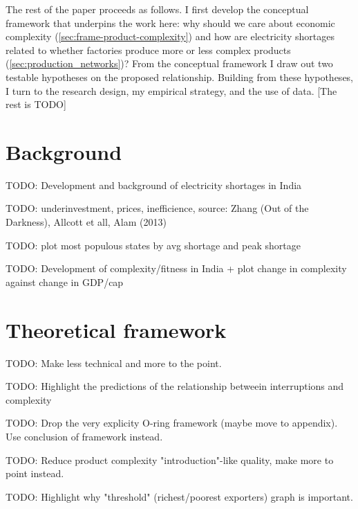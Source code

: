 \documentclass[11pt]{article}
\begin{document}
The rest of the paper proceeds as follows. I first develop the conceptual framework that underpins the work here: why should we care about economic complexity (\ref{sec:frame-product-complexity}) and how are electricity shortages related to whether factories produce more or less complex products (\ref{sec:production_networks})? From the conceptual framework I draw out two testable hypotheses on the proposed relationship. Building from these hypotheses, I turn to the research design, my empirical strategy, and the use of data. [The rest is TODO]

\newpage
\section{Background}%
\label{sec:background}

TODO: Development and background of electricity shortages in India

TODO: underinvestment, prices, inefficience, source: Zhang (Out of the Darkness), Allcott et all, Alam (2013)

TODO: plot most populous states by avg shortage and peak shortage

TODO: Development of complexity/fitness in India + plot change in complexity against change in GDP/cap



\section{Theoretical framework}%
\label{sec:framework}

TODO: Make less technical and more to the point.

TODO: Highlight the predictions of the relationship betweein interruptions and complexity

TODO: Drop the very explicity O-ring framework (maybe move to appendix). Use conclusion of framework instead.

TODO: Reduce product complexity "introduction"-like quality, make more to point instead.

TODO: Highlight why "threshold" (richest/poorest exporters) graph is important.
\end{document}
